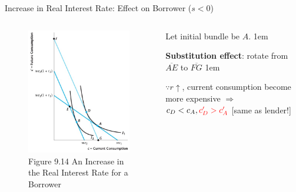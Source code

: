 \documentclass[11pt,aspectratio=43,usenames,dvipsnames]{beamer}
\newcommand{\red}[1]{\textcolor{red}{#1}}
\let\olditemize=\itemize
\let\endolditemize=\enditemize
\renewenvironment{itemize}{\olditemize \itemsep1em}{\endolditemize}
\theoremstyle{definition}
\begin{document}
\begin{frame}{Increase in Real Interest Rate: Effect on Borrower ($s < 0$)}
\label{slide:Increase_in_Real_Interest_Rate__Effect_on_Borrower}
    \begin{columns}
        \begin{column}{0.5\textwidth}
            \begin{figure}
                \caption{\scriptsize Figure 9.14  An Increase in the Real Interest Rate for a Borrower}
                \includegraphics[width=\textwidth]{./figures/Figure9_14.jpg}
            \end{figure}
        \end{column}
        \begin{column}{0.5\textwidth}
            Let initial bundle be $ A $.
            \begin{itemize}
                \item \textbf{Substitution effect}: rotate from $ \overline{AE} $ to $ \overline{FG} $
                \begin{itemize}
                    \item $ \because r \uparrow  $, \alert{current consumption become more expensive} $ \Rightarrow  $ $ c_{D} < c_{A}, \red{c'_{D} > c'_{A}} $ [same as lender!]

\end{itemize}
\end{itemize}
\end{column}
\end{columns}
\end{frame}
\end{document}
